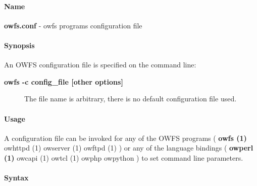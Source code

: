 \paragraph*{Name}
\textbf{owfs.conf} - owfs programs configuration file 
\paragraph*{Synopsis}
An OWFS
configuration file is specified on the command line: \begin{description}
\item [\textbf{owfs -c config\_file
[other options]} ] The file name is arbitrary, there is no default configuration
file used. 
\end{description}

\paragraph*{Usage}
A configuration file can be invoked for any of the OWFS
programs ( \textsf{\textbf{owfs (1)} \textsf{owhttpd (1)} \textsf{owserver (1)} \textsf{owftpd (1)}} ) or any of the
language bindings ( \textsf{\textbf{owperl (1)} \textsf{owcapi (1)} \textsf{owtcl (1)} owphp owpython} ) to
set command line parameters. 
\paragraph*{Syntax}


